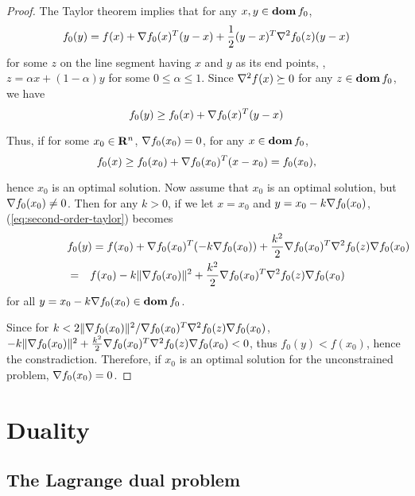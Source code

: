 \begin{itemize}
\begin{proof}
The Taylor theorem implies that for any $x,y\in\mathop{\bf dom} f_0$,
\begin{equation}
\label{eq:second-order-taylor}
f_0(y) = f(x) + \nabla f_0(x) ^T (y-x) + \frac{1}{2} (y-x)^T \nabla^2 f_0(z) (y-x)
\end{equation}
for some $z$ on the line segment having $x$ and $y$ as its end points,
\ie, $z = \alpha x + (1-\alpha) y$ for some $0\leq \alpha \leq 1$.
Since $\nabla^2 f(x) \succeq0$ for any $z \in \mathop{\bf dom} f_0$, we have
\begin{equation}
f_0(y) \geq f_0(x) + \nabla f_0(x) ^T (y-x)
\end{equation}

Thus, if for some $x_0 \in \mathbf{R}^n$, $\nabla f_0(x_0) = 0$, for any $x\in\mathop{\bf dom} f_0$,
\begin{equation}
f_0(x) \geq f_0(x_0) + \nabla f_0(x_0) ^T (x-x_0) = f_0(x_0),
\end{equation}

hence $x_0$ is an optimal solution.
Now assume that $x_0$ is an optimal solution, but $\nabla f_0(x_0) \neq 0$.
Then for any $k>0$, if we let $x=x_0$ and $y = x_0 - k \nabla f_0(x_0) $,
(\ref{eq:second-order-taylor}) becomes
\begin{eqnarray*}
\lefteqn{
f_0(y) = f(x_0) + \grad f_0(x_0) ^T (-k \grad f_0(x_0)) + \frac{k^2}{2} \grad f_0(x_0) ^T \grad^2 f_0(z) \grad f_0(x_0)
}
\\
&=&
f(x_0) - k \|\grad f_0(x_0)\|^2 + \frac{k^2}{2} \grad f_0(x_0) ^T \grad^2 f_0(z) \grad f_0(x_0)
\end{eqnarray*}
for all $y = x_0 - k \nabla f_0(x_0) \in \mathop{\bf dom} f_0$.

Since for $k< 2 \|\nabla f_0(x_0)\|^2 / \nabla f_0(x_0) ^T \nabla^2 f_0(z) \nabla f_0(x_0)$,
$-k \|\nabla f_0(x_0)\|^2 + \frac{k^2}{2} \nabla f_0(x_0) ^T \nabla^2 f_0(z) \nabla f_0(x_0) < 0$,
thus
$f_0(y) < f(x_0)$,
hence the constradiction.
Therefore, if $x_0$ is an optimal solution for the unconstrained problem, $\nabla f_0(x_0) = 0$.

\end{proof}
\end{itemize}

\section{Duality}

\subsection{The Lagrange dual problem}

